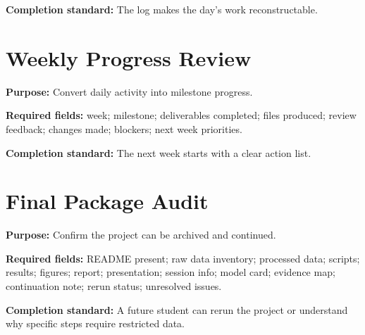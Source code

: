 \textbf{Completion standard:} The log makes the day's work reconstructable.

\section{Weekly Progress Review}
\textbf{Purpose:} Convert daily activity into milestone progress.

\textbf{Required fields:} week; milestone; deliverables completed; files produced; review feedback; changes made; blockers; next week priorities.

\textbf{Completion standard:} The next week starts with a clear action list.

\section{Final Package Audit}
\textbf{Purpose:} Confirm the project can be archived and continued.

\textbf{Required fields:} README present; raw data inventory; processed data; scripts; results; figures; report; presentation; session info; model card; evidence map; continuation note; rerun status; unresolved issues.

\textbf{Completion standard:} A future student can rerun the project or understand why specific steps require restricted data.
